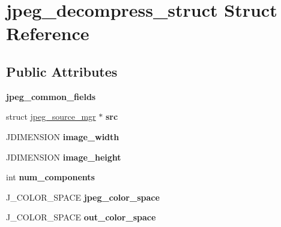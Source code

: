 \hypertarget{structjpeg__decompress__struct}{\section{jpeg\-\_\-decompress\-\_\-struct Struct Reference}
\label{structjpeg__decompress__struct}
}
\subsection*{Public Attributes}
\begin{DoxyCompactItemize}
\item 
\hypertarget{structjpeg__decompress__struct_a62d872add9f188d06908d327da2a24fd}{{\bfseries jpeg\-\_\-common\-\_\-fields}}\label{structjpeg__decompress__struct_a62d872add9f188d06908d327da2a24fd}

\item 
\hypertarget{structjpeg__decompress__struct_a044bc816f7dac33a4068d3354ca84dea}{struct \hyperlink{structjpeg__source__mgr}{jpeg\-\_\-source\-\_\-mgr} $\ast$ {\bfseries src}}\label{structjpeg__decompress__struct_a044bc816f7dac33a4068d3354ca84dea}

\item 
\hypertarget{structjpeg__decompress__struct_a433c0a54f42dfd3d2977ea967b9a21ee}{J\-D\-I\-M\-E\-N\-S\-I\-O\-N {\bfseries image\-\_\-width}}\label{structjpeg__decompress__struct_a433c0a54f42dfd3d2977ea967b9a21ee}

\item 
\hypertarget{structjpeg__decompress__struct_ad711fae8063a3e75e3c0cccd8512bedf}{J\-D\-I\-M\-E\-N\-S\-I\-O\-N {\bfseries image\-\_\-height}}\label{structjpeg__decompress__struct_ad711fae8063a3e75e3c0cccd8512bedf}

\item 
\hypertarget{structjpeg__decompress__struct_a15d5e8c34e5c66983eda5c0070f0be95}{int {\bfseries num\-\_\-components}}\label{structjpeg__decompress__struct_a15d5e8c34e5c66983eda5c0070f0be95}

\item 
\hypertarget{structjpeg__decompress__struct_a980b92cd751cbc72cc7edd1f9ef2c3e4}{J\-\_\-\-C\-O\-L\-O\-R\-\_\-\-S\-P\-A\-C\-E {\bfseries jpeg\-\_\-color\-\_\-space}}\label{structjpeg__decompress__struct_a980b92cd751cbc72cc7edd1f9ef2c3e4}

\item 
\hypertarget{structjpeg__decompress__struct_a4e69e870df7b81671043374d01efc14f}{J\-\_\-\-C\-O\-L\-O\-R\-\_\-\-S\-P\-A\-C\-E {\bfseries out\-\_\-color\-\_\-space}}\label{structjpeg__decompress__struct_a4e69e870df7b81671043374d01efc14f}


\end{DoxyCompactItemize}
